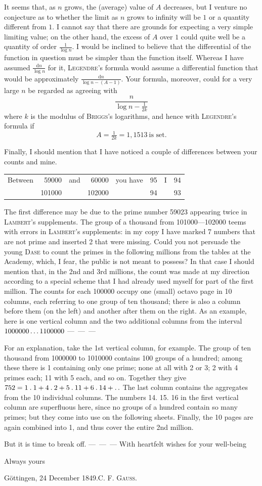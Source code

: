 It seems that, as $n$ grows, the (average) value of $A$ decreases, but I venture no conjecture as to whether the limit as $n$ grows to infinity will be $1$ or a quantity different from $1$. I cannot say that there are grounds for expecting a very simple limiting value; on the other hand, the excess of $A$ over $1$ could quite well be a quantity of order $\frac{1}{\log n}$. I would be inclined to believe that the differential of the function in question must be simpler than the function itself. Whereas I have assumed $\frac{\mathrm{d}n}{\log n}$ for it, \textsc{Legendre}’s formula would assume a differential function that would be approximately $\frac{\mathrm{d}n}{\log n-(A-1)}$. Your formula, moreover, could for a very large $n$ be regarded as agreeing with
\[
\frac{n}{\log n-\frac{1}{2k}}
\]
where $k$ is the modulus of \textsc{Briggs}’s logarithms, and hence with \textsc{Legendre}’s formula if
\[
A=\tfrac{1}{2k}=1{,}1513\ \text{is set.}
\]

Finally, I should mention that I have noticed a couple of differences between your counts and mine.
\begin{center}
\begin{tabular}{lrlrlrlr}
Between & 59000 & and & 60000 & you have & 95 & I & 94\\
 & 101000 & & 102000 & & 94 & & 93
\end{tabular}
\end{center}
The first difference may be due to the prime number 59023 appearing twice in \textsc{Lambert}’s supplements. The group of a thousand from 101000—102000 teems with errors in \textsc{Lambert}’s supplements: in my copy I have marked 7 numbers that are not prime and inserted 2 that were missing.
%
Could you not persuade the young \textsc{Dase} to count the primes in the following millions from the tables at the Academy, which, I fear, the public is not meant to possess? In that case I should mention that, in the 2nd and 3rd millions, the count was made at my direction according to a special scheme that I had already used myself for part of the first million. The counts for each 100000 occupy one (small) octavo page in 10 columns, each referring to one group of ten thousand; there is also a column before them (on the left) and another after them on the right. As an example, here is one vertical column and the two additional columns from the interval $1000000\mathinner{.\,.\,.}1100000$ \mbox{— — —}

For an explanation, take the 1st vertical column, for example. The group of ten thousand from 1000000 to 1010000 contains 100 groups of a hundred; among these there is 1 containing only one prime; none at all with 2 or 3; 2 with 4 primes each; 11 with 5 each, and so on. Together they give $752=1\mathbin{.}1+4\mathbin{.}2+5\mathbin{.}11+6\mathbin{.}14+\mathinner{.\,.}$ The last column contains the aggregates from the 10 individual columns. The numbers 14. 15. 16 in the first vertical column are superfluous here, since no groups of a hundred contain so many primes; but they come into use on the following sheets. Finally, the 10 pages are again combined into 1, and thus cover the entire 2nd million.

But it is time to break off. \mbox{— — —} With heartfelt wishes for your well-being
\begin{center}Always yours\end{center}
\noindent Göttingen, 24 December 1849.\hfill C. F. \textsc{Gauss}.
\par\endgroup

